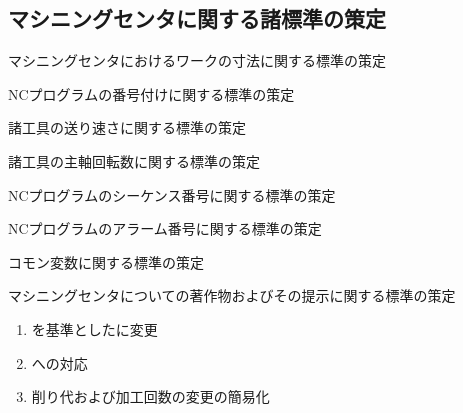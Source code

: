 \subsection{マシニングセンタに関する諸標準の策定}
\begin{enumerate}[label={\sarrow[red]}]
\item マシニングセンタにおけるワークの寸法に関する標準の策定
\item {}NCプログラムの番号付けに関する標準の策定
\item 諸工具の送り速さに関する標準の策定
\item 諸工具の主軸回転数に関する標準の策定
\item {}NCプログラムのシーケンス番号に関する標準の策定
\item[\sarrow] NCプログラムのアラーム番号に関する標準の策定
\item {}コモン変数に関する標準の策定
\item マシニングセンタについての著作物およびその提示に関する標準の策定
\end{enumerate}






\begin{enumerate}[label=\sarrow]
\item \IDCenter を基準とした\EndFacecutMilling に変更
\item \ODCornerR への対応
\item {}削り代および加工回数の変更の簡易化
\end{enumerate}



